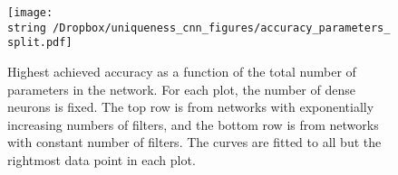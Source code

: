 \begin{figure}
  \begin{center}
    \texttt{[image: \\string~/Dropbox/uniqueness\_cnn\_figures/accuracy\_parameters\_split.pdf]}
  \end{center}
  \vspace{5mm}
  \caption{Highest achieved accuracy as a function of the total number of parameters in the network. For each plot, the number of dense neurons is fixed. The top row is from networks with exponentially increasing numbers of filters, and the bottom row is from networks  with constant number of filters. The curves are fitted to all but the rightmost data point in each plot.}
  \label{fig:accuracy_parameters_split}
\end{figure}

